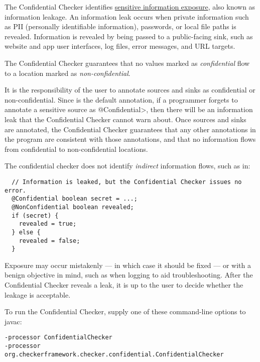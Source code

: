 \htmlhr
{}

The Confidential Checker identifies
\href{https://cwe.mitre.org/data/definitions/1417.html}{sensitive information
exposure}, also known as information leakage. An information leak occurs when private information
such as PII (personally identifiable information), passwords, or local file
paths is revealed.  Information is revealed by being passed to
a public-facing sink, such as website and app user interfaces,
log files, error messages, and URL targets.

The Confidential Checker guarantees that no values marked as
\emph{confidential} flow to a location marked as
\emph{non-confidential}.

It is the responsibility of the user to annotate sources and sinks as
confidential or non-confidential.
Since  is the default annotation, if a programmer
forgets to annotate a sensitive source as \<@Confidential>, then there will
be an information leak that the Confidential Checker cannot warn about.
Once sources and sinks are annotated, the Confidential
Checker guarantees that any other annotations in the program are consistent
with those annotations, and that no information flows from confidential to
non-confidential locations.

The confidential checker does not identify \emph{indirect} information flows, such
as in:

\begin{Verbatim}
  // Information is leaked, but the Confidential Checker issues no error.
  @Confidential boolean secret = ...;
  @NonConfidential boolean revealed;
  if (secret) {
    revealed = true;
  } else {
    revealed = false;
  }
\end{Verbatim}

Exposure may occur mistakenly --- in which case
it should be fixed --- or with a benign objective in mind, such as when
logging to aid troubleshooting.  After the Confidential Checker reveals a
leak, it is up to the user to decide whether the leakage is acceptable.

To run the Confidential Checker, supply one of these
command-line options to javac:
\begin{Verbatim}
-processor ConfidentialChecker
-processor org.checkerframework.checker.confidential.ConfidentialChecker
\end{Verbatim}



